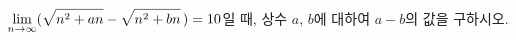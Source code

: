 $\displaystyle\lim_{n\to\infty}(\sqrt{n^2+an}-\sqrt{n^2+bn}\mkern3mu )=10$일 때, 상수 $a$, $b$에 대하여 $a-b$의 값을 구하시오.
